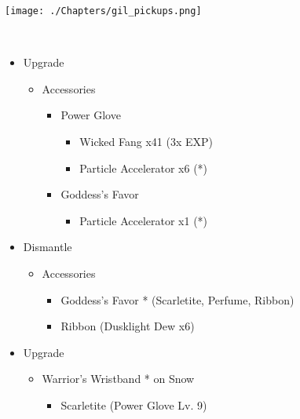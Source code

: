 	{  }
	{ 
	  {
	}
}

\begingroup
\texttt{[image: ./Chapters/gil\_pickups.png]}
\endgroup

\vfill
\ 
\columnbreak
\begin{upgrade}
	\begin{itemize}
		\item Upgrade
		      \begin{itemize}
			      \item Accessories
			            \begin{itemize}
				            \item Power Glove
				                  \begin{itemize}
					                  \item Wicked Fang x41 (3x EXP)
					                  \item Particle Accelerator x6 (*)
				                  \end{itemize}
				            \item Goddess's Favor
				                  \begin{itemize}
					                  \item Particle Accelerator x1 (*)
				                  \end{itemize}
			            \end{itemize}
		      \end{itemize}
		\item Dismantle
		      \begin{itemize}
			      \item Accessories
			            \begin{itemize}
				            \item Goddess's Favor * (Scarletite, Perfume, Ribbon)
				            \item Ribbon (Dusklight Dew x6)
			            \end{itemize}
		      \end{itemize}
		\item Upgrade
		      \begin{itemize}
			      \item Warrior's Wristband * on Snow
			            \begin{itemize}
				            \item Scarletite (Power Glove Lv. 9)
			            \end{itemize}
		      \end{itemize}
	\end{itemize}
\end{upgrade}
	{  }
	{ 
	  {
	}
}

